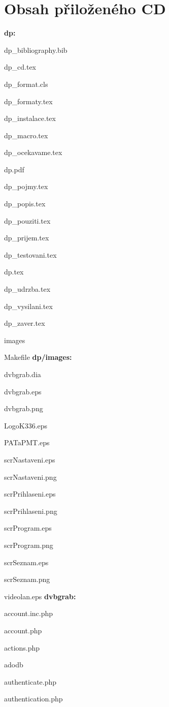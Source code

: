 \twocolumn
\chapter{Obsah přiloženého CD}
\textbf{dp:}
\bitem
\item dp\_bibliography.bib
\item dp\_cd.tex
\item dp\_format.cls
\item dp\_formaty.tex
\item dp\_instalace.tex
\item dp\_macro.tex
\item dp\_ocekavame.tex
\item dp.pdf
\item dp\_pojmy.tex
\item dp\_popis.tex
\item dp\_pouziti.tex
\item dp\_prijem.tex
\item dp\_testovani.tex
\item dp.tex
\item dp\_udrzba.tex
\item dp\_vysilani.tex
\item dp\_zaver.tex
\item images
\item Makefile
\eitem
\textbf{dp/images:}
\bitem
\item dvbgrab.dia
\item dvbgrab.eps
\item dvbgrab.png
\item LogoK336.eps
\item PATaPMT.eps
\item scrNastaveni.eps
\item scrNastaveni.png
\item scrPrihlaseni.eps
\item scrPrihlaseni.png
\item scrProgram.eps
\item scrProgram.png
\item scrSeznam.eps
\item scrSeznam.png
\item videolan.eps
\eitem
\textbf{dvbgrab:}
\bitem
\item account.inc.php
\item account.php
\item actions.php
\item adodb
\item authenticate.php
\item authentication.php
